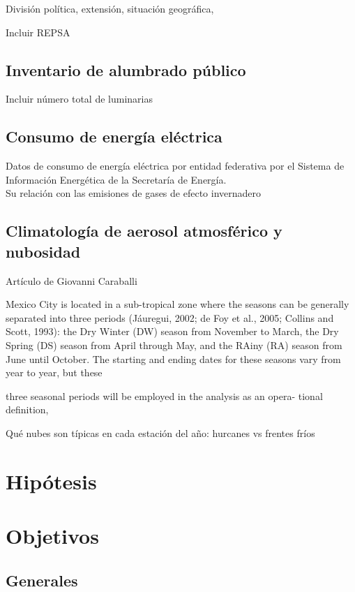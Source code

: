 División política, extensión, situación geográfica, 

Incluir REPSA

\subsection{Inventario de alumbrado público}

Incluir número total de luminarias

\subsection{Consumo de energía eléctrica}

Datos de consumo de energía eléctrica por entidad federativa por el Sistema de Información Energética de la Secretaría de Energía.\\

Su relación con las emisiones de gases de efecto invernadero 

\subsection{Climatología de aerosol atmosférico y nubosidad}

Artículo de Giovanni Caraballi

Mexico City is located in a sub-tropical zone where the seasons can
be generally separated into three periods (Jáuregui, 2002; de Foy et al.,
2005; Collins and Scott, 1993): the Dry Winter (DW) season from
November to March, the Dry Spring (DS) season from April through
May, and the RAiny (RA) season from June until October. The starting
and ending dates for these seasons vary from year to year, but these

three seasonal periods will be employed in the analysis as an opera-
tional definition,

Qué nubes son típicas en cada estación del año: hurcanes vs frentes fríos

\section{Hipótesis}

\section{Objetivos}

\subsection{Generales}


